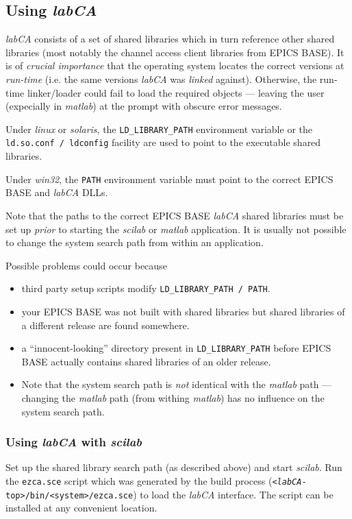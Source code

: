\documentclass{article}
\newcommand{\sca}{\ita{labCA}}
\newcommand{\scilab}{\ita{scilab}}
\newcommand{\matlab}{\ita{matlab}}
\newcommand{\windoze}{\ita{win32}}
\newcommand{\com}[1]{{\tt #1}}
\newcommand{\ita}[1]{\emph{#1}}
\begin{document}
\subsection{Using \sca{}}
\sca{} consists of a set of shared libraries which in turn reference
other shared libraries (most notably the channel access client libraries
from EPICS BASE). It is of \ita{crucial importance} that the operating
system locates the correct versions at \ita{run-time} (i.e. the same versions
\sca{} was \ita{linked} against). Otherwise, the run-time linker/loader
could fail to load the required objects --- leaving the user (expecially
in \matlab) at the prompt with obscure error messages.

Under \ita{linux} or \ita{solaris}, the \com{LD\_LIBRARY\_PATH} environment
variable or the \com{ld.so.conf / ldconfig} facility are used to point
to the executable shared libraries.

Under \windoze{}, the \com{PATH} environment variable must point to the
correct EPICS BASE and \sca{} DLLs.

Note that the paths to the correct EPICS BASE \sca{} shared libraries
must be set up \ita{prior} to starting the \scilab{} or \matlab{} application.
It is usually not possible to change the system search
path from within an application.

Possible problems could occur because
\begin{itemize}
\item third party setup scripts modify \com{LD\_LIBRARY\_PATH / PATH}.
\item your EPICS BASE was not built with shared libraries but shared libraries
of a different release are found somewhere.
\item a ``innocent-looking'' directory present in \com{LD\_LIBRARY\_PATH}
before EPICS BASE actually contains shared libraries of an older release.
\item Note that the system search path is \ita{not} identical with the
\matlab{} path --- changing the \matlab{} path (from withing \matlab)
has no influence on the system search path.
\end{itemize}

\subsubsection{Using \sca{} with \scilab}
Set up the shared library search path (as described above) and start
\scilab. Run the \com{ezca.sce} script which was generated by the build process
(\com{<\sca-top>/bin/<system>/ezca.sce}) to load the \sca{} interface.
The script can be installed at any convenient location.
\end{document}
